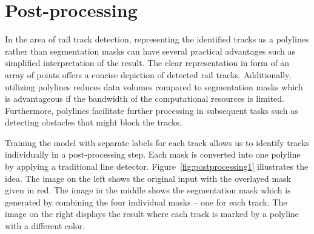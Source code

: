 \documentclass[Master,MDS,english]{BASE/twbook} %
\begin{document}
\section{Post-processing}

In the area of rail track detection, representing the identified tracks as a polylines rather than segmentation masks can have several practical advantages such as simplified interpretation of the result. The clear representation in form of an array of points offers a concise depiction of detected rail tracks. Additionally, utilizing polylines reduces data volumes compared to segmentation masks which is advantageous if the bandwidth of the computational resources is limited. Furthermore, polylines facilitate further processing in subsequent tasks such as detecting obstacles that might block the tracks. 

Training the model with separate labels for each track allows us to identify tracks individually in a post-processing step. Each mask is converted into one polyline by applying a traditional line detector.  
Figure~\ref{fig:postprocessing1} illustrates the idea. The image on the left shows the original input with the overlayed mask given in red. The image in the middle shows the segmentation mask which is generated by combining the four individual masks -- one for each track. The image on the right displays the result where each track is marked by a polyline with a different color.
\end{document}
